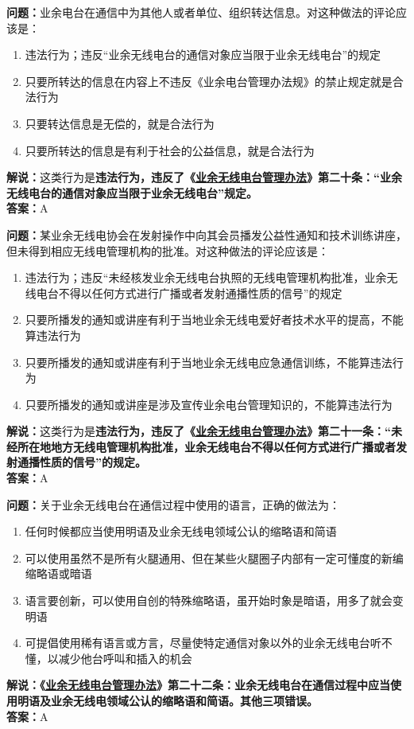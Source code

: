 \textbf{问题：}业余电台在通信中为其他人或者单位、组织转达信息。对这种做法的评论应该是：
\begin{enumerate}[label=\Alph*), leftmargin=1.5cm]
	\item 违法行为；违反“业余无线电台的通信对象应当限于业余无线电台”的规定
	\item 只要所转达的信息在内容上不违反《业余电台管理办法规》的禁止规定就是合法行为
	\item 只要转达信息是无偿的，就是合法行为
	\item 只要所转达的信息是有利于社会的公益信息，就是合法行为
\end{enumerate}
\textbf{解说：}这类行为是\textbf{违法行为，违反了《\href{https://www.miit.gov.cn/jgsj/zfs/bmgz/art/2020/art_147b69815b3641caad9047735f94c860.html}{业余无线电台管理办法}》第二十条：“业余无线电台的通信对象应当限于业余无线电台”规定。}\\\textbf{答案：}A


\textbf{问题：}某业余无线电协会在发射操作中向其会员播发公益性通知和技术训练讲座，但未得到相应无线电管理机构的批准。对这种做法的评论应该是：
\begin{enumerate}[label=\Alph*), leftmargin=1.5cm]
	\item 违法行为；违反“未经核发业余无线电台执照的无线电管理机构批准，业余无线电台不得以任何方式进行广播或者发射通播性质的信号”的规定
	\item 只要所播发的通知或讲座有利于当地业余无线电爱好者技术水平的提高，不能算违法行为
	\item 只要所播发的通知或讲座有利于当地业余无线电应急通信训练，不能算违法行为
	\item 只要所播发的通知或讲座是涉及宣传业余电台管理知识的，不能算违法行为
\end{enumerate}
\textbf{解说：}这类行为是\textbf{违法行为，违反了《\href{https://www.miit.gov.cn/jgsj/zfs/bmgz/art/2020/art_147b69815b3641caad9047735f94c860.html}{业余无线电台管理办法}》第二十一条：“未经所在地地方无线电管理机构批准，业余无线电台不得以任何方式进行广播或者发射通播性质的信号”的规定。}\\\textbf{答案：}A


\textbf{问题：}关于业余无线电台在通信过程中使用的语言，正确的做法为：
\begin{enumerate}[label=\Alph*), leftmargin=1.5cm]
	\item 任何时候都应当使用明语及业余无线电领域公认的缩略语和简语
	\item 可以使用虽然不是所有火腿通用、但在某些火腿圈子内部有一定可懂度的新编缩略语或暗语
	\item 语言要创新，可以使用自创的特殊缩略语，虽开始时象是暗语，用多了就会变明语
	\item 可提倡使用稀有语言或方言，尽量使特定通信对象以外的业余无线电台听不懂，以减少他台呼叫和插入的机会
\end{enumerate}
\textbf{解说：《\href{https://www.miit.gov.cn/jgsj/zfs/bmgz/art/2020/art_147b69815b3641caad9047735f94c860.html}{业余无线电台管理办法}》第二十二条：业余无线电台在通信过程中应当使用明语及业余无线电领域公认的缩略语和简语。其他三项错误。}\\\textbf{答案：}A


